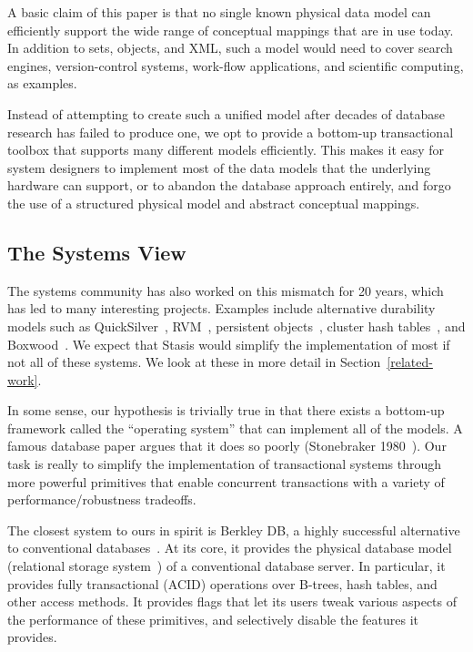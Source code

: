 \documentclass[letterpaper,twocolumn,10pt]{article}
\newcommand{\yad}{Stasis\xspace}
\begin{document}
A basic claim of
this paper is that no single known physical data model can efficiently
support the wide range of conceptual mappings that are in use today.
In addition to sets, objects, and XML, such a model would need
to cover search engines, version-control systems, work-flow
applications, and scientific computing, as examples.

Instead of attempting to create such a unified model after decades of
database research has failed to produce one, we opt to provide a
bottom-up transactional toolbox that supports many different models
efficiently.  This makes it easy for system designers to
implement most of the data models that the underlying hardware can
support, or to abandon the database approach entirely, and forgo the
use of a structured physical model and abstract conceptual mappings.

\subsection{The Systems View}

The systems community has also worked on this mismatch for 20 years,
which has led to many interesting projects.  Examples include
alternative durability models such as QuickSilver~\cite{experienceWithQuickSilver},
RVM~\cite{lrvm}, persistent objects~\cite{argus}, 
cluster hash tables~\cite{DDS}, and Boxwood~\cite{boxwood}.  We expect that \yad would simplify
the implementation of most if not all of these systems.  We look at
these in more detail in Section~\ref{related-work}.

In some sense, our hypothesis is trivially true in that there exists a
bottom-up framework called the ``operating system'' that can implement
all of the models. A famous database paper argues that it does so
poorly (Stonebraker 1980~\cite{Stonebraker80}). Our task is really to
simplify the implementation of transactional systems through more
powerful primitives that enable concurrent transactions with a variety
of performance/robustness tradeoffs.

The closest system to ours in spirit is Berkley DB,  a highly successful alternative to conventional
databases~\cite{libtp}.  At its core, it provides the physical database model
(relational storage system~\cite{systemR}) of a conventional database server.
In particular, 
it provides fully transactional (ACID) operations over B-trees, 
hash tables, and other access methods.  It provides flags that 
let its users tweak various aspects of the performance of these
primitives, and selectively disable the features it provides.
\end{document}
